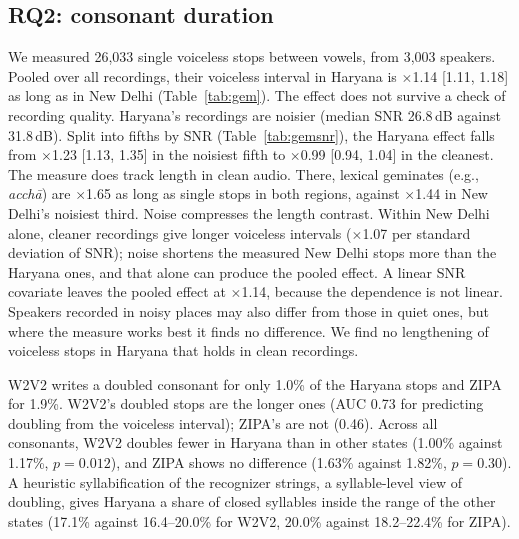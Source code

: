 \documentclass[11pt]{article}
\begin{document}
\subsection{RQ2: consonant duration}
We measured 26,033 single voiceless stops between vowels, from 3,003 speakers. Pooled over all recordings, their
voiceless interval in Haryana is $\times$1.14 [1.11, 1.18] as long as in New Delhi (Table~\ref{tab:gem}). The effect
does not survive a check of recording quality. Haryana's recordings are noisier (median SNR 26.8\,dB against
31.8\,dB). Split into fifths by SNR (Table~\ref{tab:gemsnr}), the Haryana effect falls from $\times$1.23 [1.13, 1.35]
in the noisiest fifth to $\times$0.99 [0.94, 1.04] in the cleanest. The measure does track length in clean audio.
There, lexical geminates (e.g., \textit{acch\=a}) are $\times$1.65 as long as single stops in both regions, against
$\times$1.44 in New Delhi's noisiest third. Noise compresses the length contrast. Within New Delhi alone, cleaner
recordings give longer voiceless intervals ($\times$1.07 per standard deviation of SNR); noise shortens the measured
New Delhi stops more than the Haryana ones, and that alone can produce the pooled effect. A linear SNR covariate
leaves the pooled effect at $\times$1.14, because the dependence is not linear. Speakers recorded in noisy places may
also differ from those in quiet ones, but where the measure works best it finds no difference. We find no
lengthening of voiceless stops in Haryana that holds in clean recordings.

W2V2 writes a doubled consonant for only 1.0\% of the Haryana stops and
ZIPA for 1.9\%. W2V2's doubled stops are the longer ones (AUC 0.73 for predicting doubling from the voiceless
interval); ZIPA's are not (0.46). Across all consonants, W2V2 doubles fewer in Haryana than in other states
(1.00\% against 1.17\%, $p = 0.012$), and ZIPA shows no difference (1.63\% against 1.82\%, $p = 0.30$). A heuristic
syllabification of the recognizer strings, a syllable-level view of doubling, gives Haryana a share of closed
syllables inside the range of the other states (17.1\% against 16.4--20.0\% for W2V2, 20.0\% against
18.2--22.4\% for ZIPA).

\begin{table}[t]
\centering\footnotesize

\caption{The Haryana effect on the voiceless interval within fifths of the utterance's SNR (tokens per region, and
the multiplicative effect from the primary mixed model with a 95\% confidence interval), and the length of lexical
geminates relative to single stops within thirds of SNR.}
\label{tab:gemsnr}
\end{table}
\end{document}
